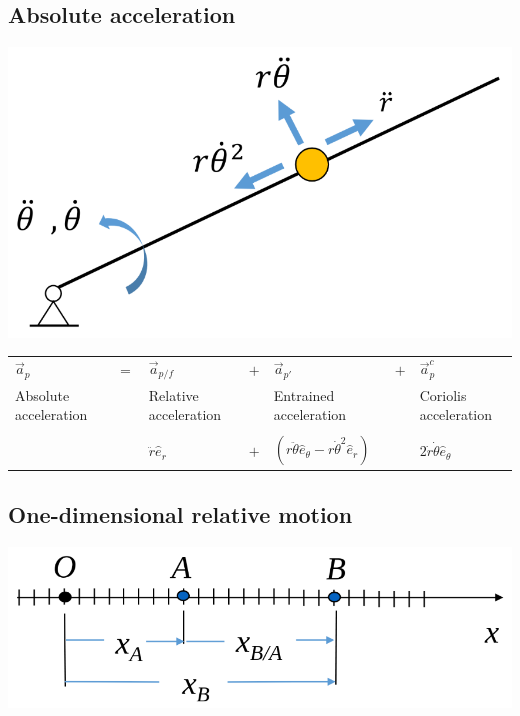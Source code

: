 \documentclass[11pt]{article}
\begin{document}
\subsection{Absolute acceleration}
\label{sec:orgc705805}
\begin{center}
\includegraphics[width=.9\linewidth]{./images/absolute-acceleration-diagram.png}
\end{center}

\begin{center}
\begin{tabular}{>{\centering\arraybackslash}m{6em} >{\centering\arraybackslash}m{2em} >{\centering\arraybackslash}m{6em} >{\centering\arraybackslash}m{2em} >{\centering\arraybackslash}m{6em} >{\centering\arraybackslash}m{2em} >{\centering\arraybackslash}m{6em}}
\(\vec{a}_p\) & \(=\) & \(\vec{a}_{p/f}\) & \(+\) & \(\vec{a}_{p'}\) & \(+\) & \(\vec{a}_p^c\)\\[0pt]
Absolute acceleration &  & Relative acceleration &  & Entrained acceleration &  & Coriolis acceleration\\[0pt]
 &  &  &  &  &  & \\[0pt]
 &  & \(\ddot{r} \hat{e}_r\) & \(+\) & \((r \ddot{\theta} \hat{e}_{\theta} - r \dot{\theta}^2 \hat{e}_r)\) &  & \(2 \dot{r} \dot{\theta} \hat{e}_{\theta}\)\\[0pt]
\end{tabular}
\end{center}

 \newpage

\subsection{One-dimensional relative motion}
\label{sec:orgc126840}
\begin{center}
\includegraphics[width=.9\linewidth]{./images/one-dimensional-relative-motion.png}
\end{center}
\end{document}
